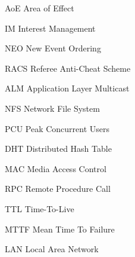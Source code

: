 \begin{Nomencl}[\gnat]
        \item[AoE]      Area of Effect
        \item[IM]       Interest Management
        \item[NEO]      New Event Ordering
        \item[RACS]     Referee Anti-Cheat Scheme
        \item[ALM]      Application Layer Multicast
        \item[NFS]      Network File System
        \item[PCU]      Peak Concurrent Users
        \item[DHT]      Distributed Hash Table
        \item[MAC]      Media Access Control
        \item[RPC]      Remote Procedure Call
        \item[TTL]      Time-To-Live
        \item[MTTF]     Mean Time To Failure
        \item[LAN]      Local Area Network
\end{Nomencl}
\endinput
